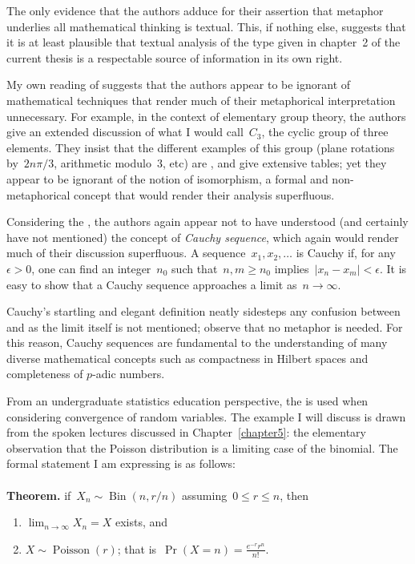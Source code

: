 The only evidence that the authors adduce for their assertion that
metaphor underlies all mathematical thinking is textual. This, if
nothing else, suggests that it is at least plausible that textual
analysis of the type given in chapter~2 of the current thesis is a
respectable source of information in its own right.

My own reading of \wmcf suggests that the authors appear to be
ignorant of mathematical techniques that render much of their
metaphorical interpretation unnecessary.  For example, in the context
of elementary group theory, the authors give an extended discussion of
what I would call~$C_3$, the cyclic group of three elements.  They
insist that the different examples of this group (plane rotations
by~$2n\pi/3$, arithmetic modulo~$3$, etc) are , and give extensive tables; yet they appear to be ignorant
of the notion of isomorphism, a formal and non-metaphorical concept
that would render their analysis superfluous.

Considering the \bmi, the authors again appear not to have understood
(and certainly have not mentioned) the concept of \emph{Cauchy
  sequence}, which again would render much of their discussion
superfluous.  A sequence~$x_1,x_2,\ldots$ is Cauchy if, for
any~$\epsilon>0$, one can find an integer~$n_0$ such
that~$n,m\geqslant n_0$ implies~$\left|{x_n-x_m}\right|<\epsilon$.  It
is easy to show that a Cauchy sequence approaches a limit
as~$n\longrightarrow\infty$.

Cauchy's startling and elegant definition neatly sidesteps any
confusion between  and  as the limit itself is not mentioned; observe that no
metaphor is needed.  For this reason, Cauchy sequences are fundamental
to the understanding of many diverse mathematical concepts such as
compactness in Hilbert spaces and completeness of $p$-adic numbers.

From an undergraduate statistics education perspective, the \bmi is
used when considering convergence of random variables.  The example I
will discuss is drawn from the spoken lectures discussed in
Chapter~\ref{chapter5}: the elementary observation that the Poisson
distribution is a limiting case of the binomial.  The formal statement
I am expressing is as follows: \\ \\

{\bf Theorem.}  if~$X_n\sim\operatorname{Bin}\left({n,r/n}\right)$
assuming~$0\leqslant r\leqslant n$, then
  \begin{enumerate}
  \item ${\displaystyle
    \lim_{n\longrightarrow\infty}X_n=X}$ exists, and
  \item $X\sim\operatorname{Poisson}\left({r}\right)$; that
    is~$\operatorname{Pr}\left({X=n}\right) = \frac{e^{-r}{r^n}}{n!}$.
  \end{enumerate}

